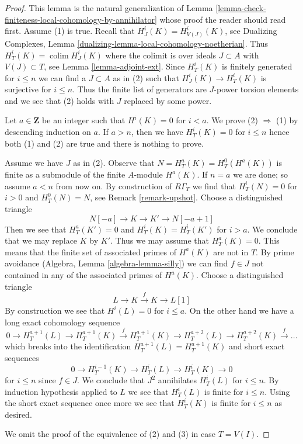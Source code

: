 \documentclass{stacks-project}
\theoremstyle{plain}
\theoremstyle{definition}
\theoremstyle{remark}
\numberwithin{equation}{subsection}
\def\colim{\mathop{\mathrm{colim}}\nolimits}
\begin{document}
\begin{proof}
This lemma is the natural generalization of
Lemma \ref{lemma-check-finiteness-local-cohomology-by-annihilator}
whose proof the reader should read first.
Assume (1) is true. Recall that $H^i_J(K) = H^i_{V(J)}(K)$, see
Dualizing Complexes, Lemma \ref{dualizing-lemma-local-cohomology-noetherian}.
Thus $H^i_T(K) = \colim H^i_J(K)$ where the colimit is over ideals
$J \subset A$ with $V(J) \subset T$, see
Lemma \ref{lemma-adjoint-ext}. Since $H^i_T(K)$ is finitely generated
for $i \leq n$ we can find a $J \subset A$ as in (2) such that
$H^i_J(K) \to H^i_T(K)$ is surjective for $i \leq n$.
Thus the finite list of generators are $J$-power torsion elements
and we see that (2) holds with $J$ replaced by some power.

\medskip\noindent
Let $a \in \mathbf{Z}$ be an integer such that $H^i(K) = 0$ for $i < a$.
We prove (2) $\Rightarrow$ (1) by descending induction on $a$.
If $a > n$, then we have $H^i_T(K) = 0$ for $i \leq n$ hence both
(1) and (2) are true and there is nothing to prove.

\medskip\noindent
Assume we have $J$ as in (2). Observe that $N = H^a_T(K) = H^0_T(H^a(K))$
is finite as a submodule of the finite $A$-module $H^a(K)$.
If $n = a$ we are done; so assume $a < n$ from now on. By construction of
$R\Gamma_T$ we find that $H^i_T(N) = 0$ for $i > 0$ and $H^0_T(N) = N$, see
Remark \ref{remark-upshot}. Choose a distinguished triangle
$$
N[-a] \to K \to K' \to N[-a + 1]
$$
Then we see that $H^a_T(K') = 0$ and $H^i_T(K) = H^i_T(K')$ for $i > a$.
We conclude that we may replace $K$ by $K'$. Thus we may assume that
$H^a_T(K) = 0$. This means that the finite set of associated primes of
$H^a(K)$ are not in $T$. By prime avoidance
(Algebra, Lemma \ref{algebra-lemma-silly}) we can find $f \in J$
not contained in any of the associated primes of $H^a(K)$.
Choose a distinguished triangle
$$
L \to K \xrightarrow{f} K \to L[1]
$$
By construction we see that $H^i(L) = 0$ for $i \leq a$.
On the other hand we have a long exact cohomology sequence
$$
0 \to H^{a + 1}_T(L) \to H^{a + 1}_T(K) \xrightarrow{f}
H^{a + 1}_T(K) \to H^{a + 2}_T(L) \to H^{a + 2}_T(K) \xrightarrow{f} \ldots
$$
which breaks into the identification $H^{a + 1}_T(L) = H^{a + 1}_T(K)$
and short exact sequences
$$
0 \to H^{i - 1}_T(K) \to H^i_T(L) \to H^i_T(K) \to 0
$$
for $i \leq n$ since $f \in J$.
We conclude that $J^2$ annihilates $H^i_T(L)$ for $i \leq n$.
By induction hypothesis applied to $L$ we see that $H^i_T(L)$
is finite for $i \leq n$. Using the short exact sequence once more
we see that $H^i_T(K)$ is finite for $i \leq n$ as desired.

\medskip\noindent
We omit the proof of the equivalence of (2) and (3)
in case $T = V(I)$.
\end{proof}
\end{document}
